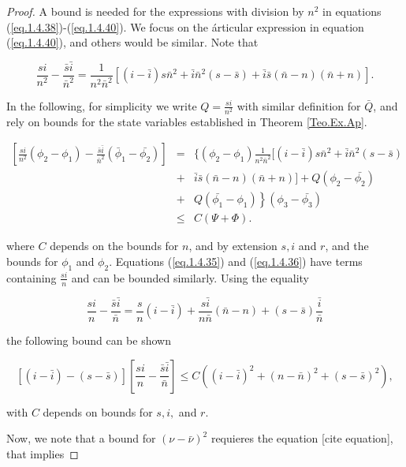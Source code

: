 \begin{proof}
A bound is needed for the expressions with division by $n^2$ in equations (\ref{eq.1.4.38})-(\ref{eq.1.4.40}). We focus on the árticular expression in equation (\ref{eq.1.4.40}), and others would be similar. Note that

\begin{equation*}
\frac{si}{n^2}-\frac{\bar{s}\bar{i}}{\bar{n}^2}=\frac{1}{n^2\bar{n}^2}[(i-\bar{i})s\bar{n}^2+\bar{i}\bar{n}^2(s-\bar{s})+\bar{i}\bar{s}(\bar{n}-n)(\bar{n}+n)].
\end{equation*}

In the following, for simplicity we write $Q=\frac{si}{n^2}$ with similar definition for $\bar{Q}$, and rely on bounds for the state variables established in Theorem \ref{Teo.Ex.Ap}.

\begin{eqnarray}
\left[\frac{si}{n^2}(\phi_2-\phi_1)-\frac{\bar{s}\bar{i}}{\bar{n}^2}(\bar{\phi}_1-\bar{\phi_2})\right]&=&\{(\phi_2-\phi_1)\frac{1}{n^2\bar{n}^2}[(i-\bar{i})s\bar{n}^2+\bar{i}\bar{n}^2(s-\bar{s})\nonumber\\
&+&\bar{i}\bar{s}(\bar{n}-n)(\bar{n}+n)]+Q(\phi_2-\bar{\phi_2})\nonumber\\
&+&\left. Q(\bar{\phi_1}-\phi_1)\right\}(\phi_3-\bar{\phi_3})\nonumber \\
&\leq& C(\Psi+\Phi). \label{eq.1.4.44}
\end{eqnarray}

where $C$ depends on the bounds for $n$, and by extension $s,i$ and $r$, and the bounds for $\phi_1$ and $\phi_2$. Equations (\ref{eq.1.4.35}) and (\ref{eq.1.4.36}) have terms containing $\frac{si}{n}$ and can be bounded similarly. Using the equality

\begin{equation*}
\frac{si}{n}-\frac{\bar{s}\bar{i}}{\bar{n}}=\frac{s}{n}(i-\bar{i})+\frac{s\bar{i}}{n\bar{n}}(\bar{n}-n)+(s-\bar{s})\frac{\bar{i}}{\bar{n}}
\end{equation*}

the following bound can be shown

\begin{equation}\label{eq.1.4.45}
[(i-\bar{i})-(s-\bar{s})]\left[\frac{si}{n}-\frac{\bar{s}\bar{i}}{\bar{n}}\right]\leq C((i-\bar{i})^2+(n-\bar{n})^2+(s-\bar{s})^2),
\end{equation}

with $C$ depends on bounds for $s,i,$ and $r$.

Now, we note that a bound for $(\nu-\bar{\nu})^2$ requieres the equation [cite equation], that implies


\end{proof}

